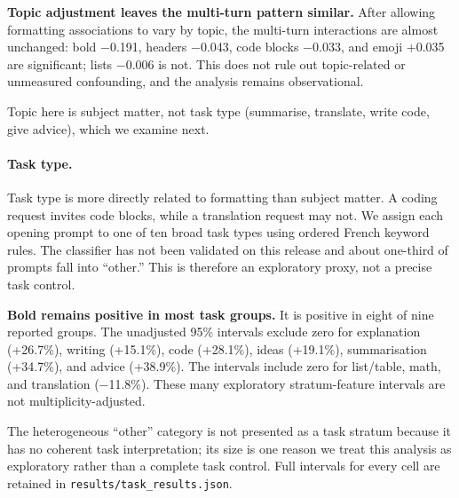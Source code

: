 \documentclass[
]{article}
\begin{document}
\textbf{Topic adjustment leaves the multi-turn pattern similar.} After
allowing formatting associations to vary by topic, the multi-turn
interactions are almost unchanged: bold −0.191, headers −0.043, code
blocks −0.033, and emoji +0.035 are significant; lists −0.006 is not.
This does not rule out topic-related or unmeasured confounding, and the
analysis remains observational.

Topic here is subject matter, not task type (summarise, translate, write
code, give advice), which we examine next.

\paragraph{Task type.}\label{does-task-type-explain-the-formatting-association}

Task type is more directly related to formatting than subject matter. A
coding request invites code blocks, while a translation request may not.
We assign each opening prompt to one of ten broad task types using
ordered French keyword rules. The classifier has not been validated on
this release and about one-third of prompts fall into ``other.'' This is
therefore an exploratory proxy, not a precise task control.

\textbf{Bold remains positive in most task groups.} It is positive in
eight of nine reported groups. The unadjusted 95\% intervals exclude
zero for explanation (+26.7\%), writing (+15.1\%), code (+28.1\%), ideas
(+19.1\%), summarisation (+34.7\%), and advice (+38.9\%). The intervals
include zero for list/table, math, and translation (−11.8\%). These many
exploratory stratum-feature intervals are not multiplicity-adjusted.

The heterogeneous ``other'' category is not presented as a task stratum
because it has no coherent task interpretation; its size is one reason
we treat this analysis as exploratory rather than a complete task
control. Full intervals for every cell are retained in
\texttt{results/task\_results.json}.
\end{document}
